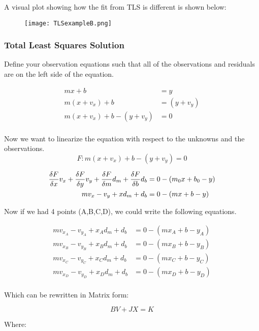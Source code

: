 A visual plot showing how the fit from TLS is different is shown below:
\begin{figure}[H]
	\centering
	\texttt{[image: TLSexampleB.png]}
\end{figure}

\subsubsection*{Total Least Squares Solution}
Define your observation equations such that all of the observations and residuals are on the left side of the equation.

\begin{align*}
mx + b &= y \\
m(x+v_x) + b &= (y+v_y) \\
m(x+v_x) + b - (y+v_y) &= 0 \\
\end{align*}

Now we want to linearize the equation with respect to the unknowns and the observations.  
\[
F: m(x+v_x) + b - (y+v_y) = 0
\]

\begin{align*}
\frac{\delta F}{\delta x}v_x + \frac{\delta F}{\delta y}v_y + \frac{\delta F}{\delta m}d_m + \frac{\delta F}{\delta b}d_b &= 0 - (m_0x+b_0-y) \\
mv_x -v_y + xd_m + d_b &= 0 - (mx+b-y) \\
\end{align*}

Now if we had 4 points (A,B,C,D), we could write the following equations.

\begin{align*}
mv_{x_A} -v_{y_A} + x_Ad_m + d_b &= 0 - (mx_A+b-y_A) \\
mv_{x_B} -v_{y_B} + x_Bd_m + d_b &= 0 - (mx_B+b-y_B) \\
mv_{x_C} -v_{y_C} + x_Cd_m + d_b &= 0 - (mx_C+b-y_C) \\
mv_{x_D} -v_{y_D} + x_Dd_m + d_b &= 0 - (mx_D+b-y_D) \\
\end{align*}

Which can be rewritten in Matrix form:

\[
BV + JX = K
\]

Where:

